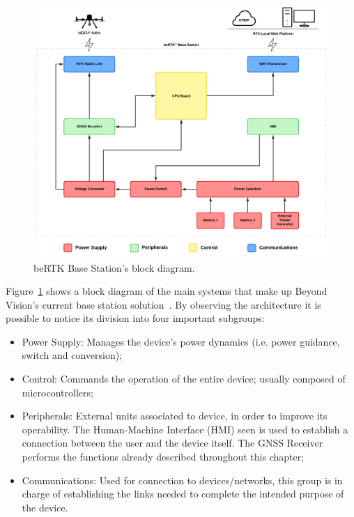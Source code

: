 \begin{figure}[h]
	\centering
	\includegraphics[width=1.0\textwidth]{Chapters/Figures/architecture_original_v2.pdf}
	\caption{beRTK\textsuperscript{\textregistered} Base Station's block diagram.}
	\label{fig:architecture_original}
\end{figure}

Figure~\ref{fig:architecture_original} shows a block diagram of the main systems that make up Beyond Vision's current base station solution~\cite{beRTK_2022}.
By observing the architecture it is possible to notice its division into four important subgroups:
\begin{itemize}
    \item Power Supply: Manages the device's power dynamics (i.e. power guidance, switch and conversion);
    \item Control: Commands the operation of the entire device; usually composed of microcontrollers;
    \item Peripherals: External units associated to device, in order to improve its operability. The Human-Machine Interface (HMI) seen is used to establish a connection between the user and the device itself. The GNSS Receiver performs the functions already described throughout this chapter;
    \item Communications: Used for connection to devices/networks, this group is in charge of establishing the links needed to complete the intended purpose of the device.
\end{itemize}

